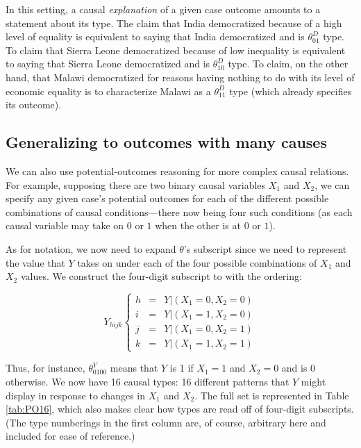 \documentclass[
  12pt,
]{book}
\begin{document}
In this setting, a causal \emph{explanation} of a given case outcome amounts to a statement about its type. The claim that India democratized because of a high level of equality is equivalent to saying that India democratized and is \(\theta^D_{01}\) type. To claim that Sierra Leone democratized because of low inequality is equivalent to saying that Sierra Leone democratized and is \(\theta^D_{10}\) type. To claim, on the other hand, that Malawi democratized for reasons having nothing to do with its level of economic equality is to characterize Malawi as a \(\theta^D_{11}\) type (which already specifies its outcome).

\hypertarget{generalizing-to-outcomes-with-many-causes}{%
\subsection{Generalizing to outcomes with many causes}\label{generalizing-to-outcomes-with-many-causes}}

We can also use potential-outcomes reasoning for more complex causal relations. For example, supposing there are two binary causal variables \(X_1\) and \(X_2\), we can specify any given case's potential outcomes for each of the different possible combinations of causal conditions---there now being four such conditions (as each causal variable may take on \(0\) or \(1\) when the other is at \(0\) or \(1\)).

As for notation, we now need to expand \(\theta\)'s subscript since we need to represent the value that \(Y\) takes on under each of the four possible combinations of \(X_1\) and \(X_2\) values. We construct the four-digit subscript to with the ordering:

\[Y_{hijk} \left\{\begin{array}{ccc}  h& =& Y|(X_1=0, X_2=0)\\
 i &=& Y|(X_1=1, X_2=0)\\
 j &=& Y|(X_1=0, X_2=1)\\
 k &=& Y|(X_1=1, X_2=1)
 \end{array} \right.\]

Thus, for instance, \(\theta^Y_{0100}\) means that \(Y\) is 1 if \(X_1=1\) and \(X_2=0\) and is 0 otherwise. We now have 16 causal types: 16 different patterns that \(Y\) might display in response to changes in \(X_1\) and \(X_2\). The full set is represented in Table \ref{tab:PO16}, which also makes clear how types are read off of four-digit subscripts. (The type numberings in the first column are, of course, arbitrary here and included for ease of reference.)
\end{document}
